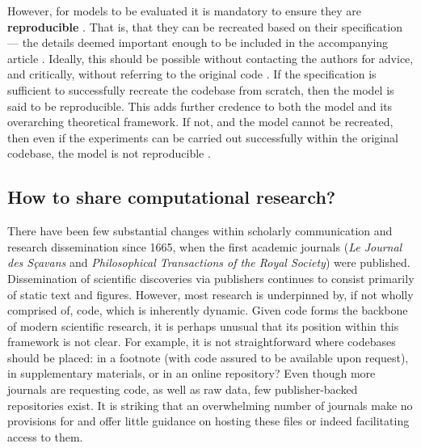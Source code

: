 \documentclass[jou]{apa6}
\begin{document}
However, for models to be evaluated
it is mandatory to ensure they are \textbf{reproducible} \cite{topalidou15}.  
That is, that they can be recreated based on their specification --- the details deemed important enough to be included in the accompanying article \cite{hinsen15}.
Ideally, this should be possible without contacting the authors for advice, and critically, without referring to the original code \cite{cooper14}.
If the specification is sufficient to successfully recreate the codebase from scratch, then the model is said to be reproducible.
This adds further credence to both the model and its overarching theoretical framework.
If not, and the model cannot be recreated, then even if the experiments can be carried out successfully within the original codebase, the model is not reproducible \cite{crook13}.

\subsection*{How to share computational research?}
There have been few substantial changes within scholarly communication and research dissemination since 1665, when the first academic journals (\textit{Le Journal des Sçavans} and \textit{Philosophical Transactions of the Royal Society}) were published.
Dissemination of scientific discoveries via publishers continues to consist primarily of static text and figures.
However, most research is underpinned by, if not wholly comprised of, code, which is inherently dynamic.
Given code forms the backbone of modern scientific research, it is perhaps unusual that its position within this framework is not clear.
For example, it is not straightforward where codebases should be placed: in a footnote (with code assured to be available upon request), in supplementary materials, or in an online repository?
Even though more journals are requesting code, as well as raw data, few publisher-backed repositories exist.
It is striking that an overwhelming number of journals make no provisions for and offer little guidance on hosting these files or indeed facilitating access to them.
\end{document}
